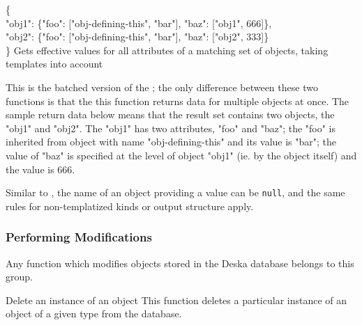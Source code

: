 \documentclass[deska]{subfiles}
\begin{document}
    { \{ \\
        "obj1": \{"foo": ["obj-defining-this", "bar"], "baz": ["obj1", 666]\}, \\ 
        "obj2": \{"foo": ["obj-defining-this", "bar"], "baz": ["obj2", 333]\} \\ 
      \} }
    {Gets effective values for all attributes of a matching set of objects, taking templates into account}
    {This is the batched version of the ; the only difference between these
    two functions is that the this function returns data for multiple objects at once.  The sample return data below
    means that the result set contains two objects, the "obj1" and "obj2".  The "obj1" has two attributes, "foo" and
    "baz"; the "foo" is inherited from object with name "obj-defining-this" and its value is "bar"; the value of "baz"
    is specified at the level of object "obj1" (ie. by the object itself) and the value is 666.

    Similar to , the name of an object providing a value can be {\tt null},
    and the same rules for non-templatized kinds or output structure apply.

    \deskaUnsortedRes}

\subsubsection{Performing Modifications}
\label{sec:api-group-data-modification}

Any function which modifies objects stored in the Deska database belongs to this group.

    {}
    {Delete an instance of an object}
    {This function deletes a particular instance of an object of a given type from the database.}
\end{document}
